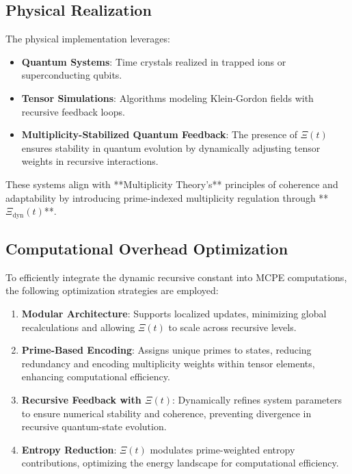 \documentclass{article}
\theoremstyle{plain}
\begin{document}
\begin{itemize}
\subsection{Physical Realization}
The physical implementation leverages:
\begin{itemize}
    \item \textbf{Quantum Systems}: Time crystals realized in trapped ions or superconducting qubits.
    \item \textbf{Tensor Simulations}: Algorithms modeling Klein-Gordon fields with recursive feedback loops.
    \item \textbf{Multiplicity-Stabilized Quantum Feedback}: The presence of \(\Xi(t) \) ensures stability in quantum evolution by dynamically adjusting tensor weights in recursive interactions.
\end{itemize}
These systems align with **Multiplicity Theory’s** principles of coherence and adaptability by introducing prime-indexed multiplicity regulation through **$\Xi_{\text{dyn}}(t)$**.

\subsection{Computational Overhead Optimization}
To efficiently integrate the dynamic recursive constant into MCPE computations, the following optimization strategies are employed:
\begin{enumerate}
    \item \textbf{Modular Architecture}: Supports localized updates, minimizing global recalculations and allowing \(\Xi(t) \) to scale across recursive levels.
    \item \textbf{Prime-Based Encoding}: Assigns unique primes to states, reducing redundancy and encoding multiplicity weights within tensor elements, enhancing computational efficiency.
    \item \textbf{Recursive Feedback with \(\Xi(t) \)}: Dynamically refines system parameters to ensure numerical stability and coherence, preventing divergence in recursive quantum-state evolution.
    \item \textbf{Entropy Reduction}: \(\Xi(t) \) modulates prime-weighted entropy contributions, optimizing the energy landscape for computational efficiency.
\end{enumerate}


\end{itemize}
\end{document}
